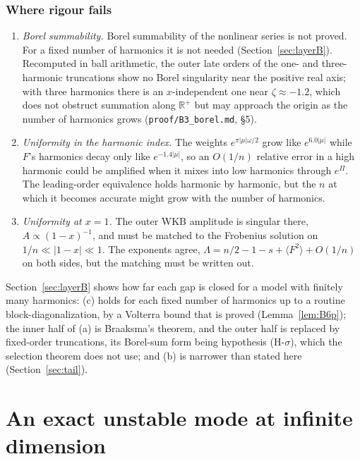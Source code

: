 \documentclass{amsart}
\numberwithin{equation}{section}
\theoremstyle{plain}
\theoremstyle{definition}
\theoremstyle{remark}
\newcommand{\repo}[1]{\texttt{#1}}
\begin{document}
\subsubsection*{Where rigour fails}
\begin{enumerate}[label=(\alph*),leftmargin=2em]
\item \emph{Borel summability.} Borel summability of the nonlinear series is not proved. For a fixed number of harmonics
it is not needed (Section~\ref{sec:layerB}). Recomputed in ball arithmetic, the outer late orders of the one- and
three-harmonic truncations show no Borel singularity near the positive real axis; with three harmonics there is an
$x$-independent one near $\zeta \approx -1.2$, which does not obstruct summation along $\mathbb R^+$ but may approach the
origin as the number of harmonics grows (\repo{proof/B3\_borel.md}, \S5).
\item \emph{Uniformity in the harmonic index.} The weights $e^{\pi|\mu|\omega/2}$ grow like $e^{6.0|\mu|}$ while $F$'s
harmonics decay only like $e^{-1.4|\mu|}$, so an $O(1/n)$ relative error in a high harmonic could be amplified when it
mixes into low harmonics through $e^{\Pi}$. The leading-order equivalence holds harmonic by harmonic, but the $n$ at which
it becomes accurate might grow with the number of harmonics.
\item \emph{Uniformity at $x = 1$.} The outer WKB amplitude is singular there, $A \propto (1-x)^{-1}$, and must be matched
to the Frobenius solution on $1/n \ll |1-x| \ll 1$. The exponents agree, $\Lambda = n/2 - 1 - s + \langle F^2\rangle + O(1/n)$
on both sides, but the matching must be written out.
\end{enumerate}
Section~\ref{sec:layerB} shows how far each gap is closed for a model with finitely many harmonics: (c) holds for each fixed
number of harmonics up to a routine block-diagonalization, by a Volterra bound that is proved (Lemma~\ref{lem:B6p}); the
inner half of (a) is Braaksma's theorem, and the outer half is replaced by fixed-order truncations, its Borel-sum form
being hypothesis (H-$\sigma$), which the selection theorem does not use; and (b) is narrower than stated here
(Section~\ref{sec:tail}).

\section{An exact unstable mode at infinite dimension}
\label{sec:prop5}
\end{document}
